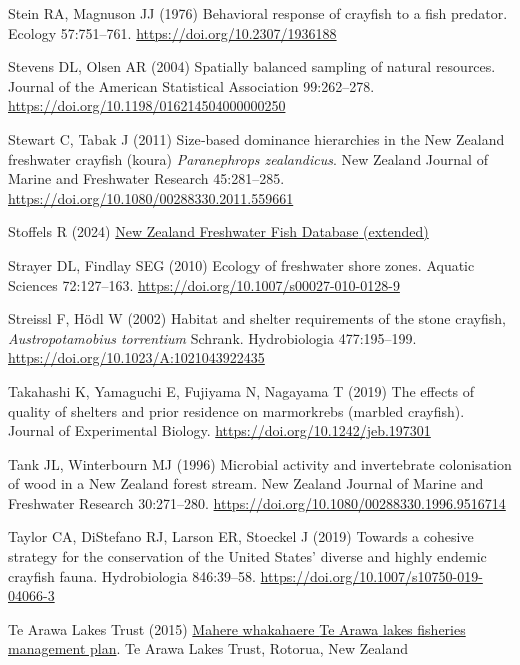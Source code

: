 \documentclass[
  12pt,
  a4paper,
  oneside]{scrbook}
\newlength{\cslhangindent}
\newenvironment{CSLReferences}[2] %
 {\begin{list}{}{%
  \setlength{\itemindent}{0pt}
  \setlength{\leftmargin}{0pt}
  \setlength{\parsep}{0pt}
  \ifodd #1
   \setlength{\leftmargin}{\cslhangindent}
   \setlength{\itemindent}{-1\cslhangindent}
  \fi
  \setlength{\itemsep}{#2\baselineskip}}}
 {\end{list}}
\begin{document}
\begin{CSLReferences}{1}{1}
Stein RA, Magnuson JJ (1976) Behavioral response of crayfish to a fish
predator. Ecology 57:751--761. \url{https://doi.org/10.2307/1936188}

Stevens DL, Olsen AR (2004) Spatially balanced sampling of natural
resources. Journal of the American Statistical Association 99:262--278.
\url{https://doi.org/10.1198/016214504000000250}

Stewart C, Tabak J (2011) Size‐based dominance hierarchies in the {New
Zealand} freshwater crayfish (koura) {\emph{Paranephrops zealandicus}}.
New Zealand Journal of Marine and Freshwater Research 45:281--285.
\url{https://doi.org/10.1080/00288330.2011.559661}

Stoffels R (2024) \href{https://doi.org/10.15468/jbpw92}{{New Zealand
Freshwater Fish Database} (extended)}

Strayer DL, Findlay SEG (2010) Ecology of freshwater shore zones.
Aquatic Sciences 72:127--163.
\url{https://doi.org/10.1007/s00027-010-0128-9}

Streissl F, Hödl W (2002) Habitat and shelter requirements of the stone
crayfish, {\emph{Austropotamobius torrentium}} {Schrank}. Hydrobiologia
477:195--199. \url{https://doi.org/10.1023/A:1021043922435}

Takahashi K, Yamaguchi E, Fujiyama N, Nagayama T (2019) The effects of
quality of shelters and prior residence on marmorkrebs (marbled
crayfish). Journal of Experimental Biology.
\url{https://doi.org/10.1242/jeb.197301}

Tank JL, Winterbourn MJ (1996) Microbial activity and invertebrate
colonisation of wood in a {New Zealand} forest stream. New Zealand
Journal of Marine and Freshwater Research 30:271--280.
\url{https://doi.org/10.1080/00288330.1996.9516714}

Taylor CA, DiStefano RJ, Larson ER, Stoeckel J (2019) Towards a cohesive
strategy for the conservation of the {United States}' diverse and highly
endemic crayfish fauna. Hydrobiologia 846:39--58.
\url{https://doi.org/10.1007/s10750-019-04066-3}

Te Arawa Lakes Trust (2015)
\href{https://tearawa.io/wp-content/uploads/2021/07/Mahere-Whakahaere-Fisheries-Management-Plan-Te-Arawa-Lakes-Trust.pdf}{Mahere
whakahaere {Te Arawa} lakes fisheries management plan}. Te Arawa Lakes
Trust, Rotorua, New Zealand


\end{CSLReferences}
\end{document}
